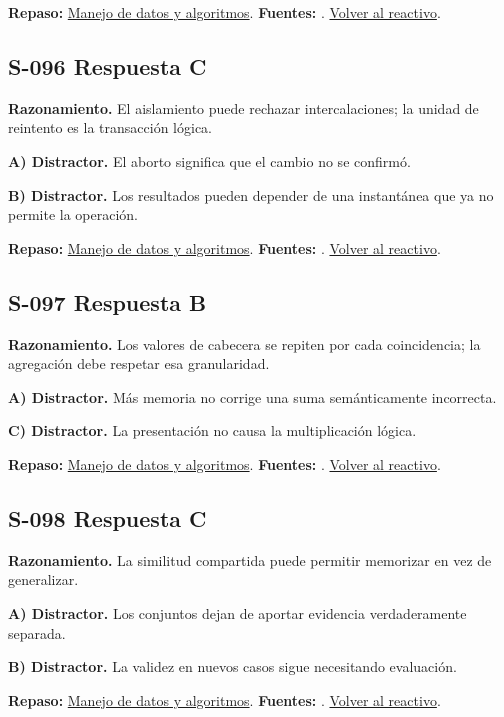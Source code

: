 \textbf{Repaso:} \hyperref[sec:s3]{Manejo de datos y algoritmos}. \textbf{Fuentes:} \cite{ai}. \hyperref[q:S-095]{Volver al reactivo}.\par\medskip

\subsection*{S-096 \quad Respuesta C}\label{s:S-096}
\textbf{Razonamiento.} El aislamiento puede rechazar intercalaciones; la unidad de reintento es la transacción lógica.

\textbf{A) Distractor. }El aborto significa que el cambio no se confirmó.

\textbf{B) Distractor. }Los resultados pueden depender de una instantánea que ya no permite la operación.

\textbf{Repaso:} \hyperref[sec:s3]{Manejo de datos y algoritmos}. \textbf{Fuentes:} \cite{postgres}. \hyperref[q:S-096]{Volver al reactivo}.\par\medskip

\subsection*{S-097 \quad Respuesta B}\label{s:S-097}
\textbf{Razonamiento.} Los valores de cabecera se repiten por cada coincidencia; la agregación debe respetar esa granularidad.

\textbf{A) Distractor. }Más memoria no corrige una suma semánticamente incorrecta.

\textbf{C) Distractor. }La presentación no causa la multiplicación lógica.

\textbf{Repaso:} \hyperref[sec:s3]{Manejo de datos y algoritmos}. \textbf{Fuentes:} \cite{postgres}. \hyperref[q:S-097]{Volver al reactivo}.\par\medskip

\subsection*{S-098 \quad Respuesta C}\label{s:S-098}
\textbf{Razonamiento.} La similitud compartida puede permitir memorizar en vez de generalizar.

\textbf{A) Distractor. }Los conjuntos dejan de aportar evidencia verdaderamente separada.

\textbf{B) Distractor. }La validez en nuevos casos sigue necesitando evaluación.

\textbf{Repaso:} \hyperref[sec:s3]{Manejo de datos y algoritmos}. \textbf{Fuentes:} \cite{algorithms,postgres,ai}. \hyperref[q:S-098]{Volver al reactivo}.\par\medskip

